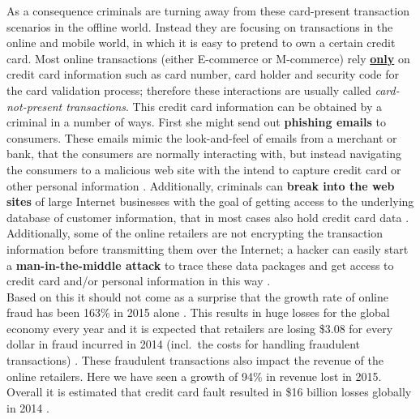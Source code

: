 As a consequence criminals are turning away from these card-present transaction scenarios in the offline world. Instead they are focusing on transactions in the online and mobile world, in which it is easy to pretend to own a certain credit card. Most online transactions (either E-commerce or M-commerce) rely \textbf{\underline{only}} on credit card information such as card number, card holder and security code for the card validation process; therefore these interactions are usually called \textit{card-not-present transactions}. This credit card information can be obtained by a criminal in a number of ways. First she might send out \textbf{phishing emails} to consumers. These emails mimic the look-and-feel of emails from a merchant or bank, that the consumers are normally interacting with, but instead navigating the consumers to a malicious web site with the intend to capture credit card or other personal information \citep{ConsumerAction2009}. Additionally, criminals can \textbf{break into the web sites} of large Internet businesses with the goal of getting access to the underlying database of customer information, that in most cases also hold credit card data \citep{Holmes2015}. Additionally, some of the online retailers are not encrypting the transaction information before transmitting them over the Internet; a hacker can easily start a \textbf{man-in-the-middle attack} to trace these data packages and get access to credit card and/or personal information in this way \citep{Captain2015}. \\

Based on this it should not come as a surprise that the growth rate of online fraud has been 163\% in 2015 alone \citep{PYMNTS2016}. This results in huge losses for the global economy every year and it is expected that retailers are losing \$3.08 for every dollar in fraud incurred in 2014 (incl.\ the costs for handling fraudulent transactions) \citep{Rampton2015}. These fraudulent transactions also impact the revenue of the online retailers. Here we have seen a growth of 94\% in revenue lost in 2015. Overall it is estimated that credit card fault resulted in \$16 billion losses globally in 2014 \citep{PYMNTS2016} \citep{BusinessWire2015}. \\

